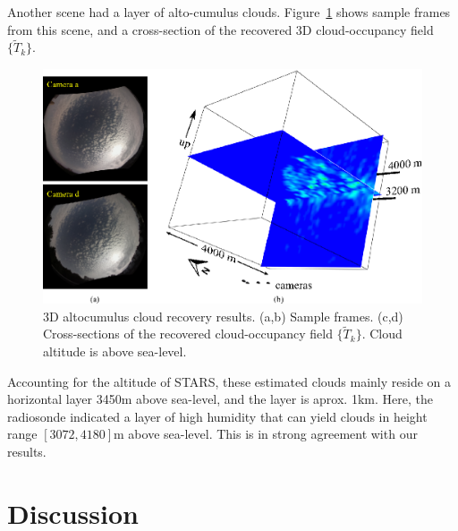 \documentclass[runningheads]{llncs}
\begin{document}
Another scene had a layer of alto-cumulus clouds. Figure~\ref{fig:alto} shows sample frames from this scene, and a cross-section of the recovered 3D cloud-occupancy field $\{\tilde T_k\}$.
\begin{figure}[t!]
\begin{center}
   \includegraphics[width=1\linewidth]{figures/altos.eps}
\end{center}
   \vspace{-0.6cm}
   \caption{3D altocumulus cloud recovery results. (a,b) Sample frames.
   (c,d)  Cross-sections of the recovered cloud-occupancy field $\{\tilde T_k\}$. Cloud
   altitude is above sea-level.}
\label{fig:alto}
\end{figure}
Accounting for the altitude of STARS, these estimated clouds mainly reside on a horizontal layer 3450m above sea-level, and the layer is aprox. 1km. Here, the radiosonde indicated a layer of high humidity that can yield clouds in height range $[3072,4180]$m above sea-level. This is in strong agreement with our results.





%

\section{Discussion}
\label{sec:discuss}
\end{document}
